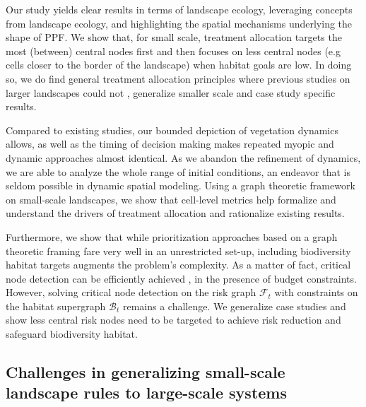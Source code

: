 Our study yields clear results in terms of landscape ecology, leveraging concepts from landscape ecology, and highlighting the spatial mechanisms underlying the shape of PPF. We show that, for small scale, treatment allocation targets the most (between) central nodes first and then focuses on less central nodes (e.g cells closer to the border of the landscape) when habitat goals are low. In doing so, we do find general treatment allocation principles where previous studies on larger landscapes could not \citep{minas_spatial_2014, rachmawati_optimisation_2016}, generalize smaller scale \citep{konoshima_spatial-endogenous_2008} and case study specific \citep{yemshanov_detecting_2021, pais_downstream_2021} results.

Compared to existing studies, our bounded depiction of vegetation dynamics allows, as well as the timing of decision making makes repeated myopic and dynamic approaches almost identical. As we abandon the refinement of dynamics, we are able to analyze the whole range of initial conditions, an endeavor that is seldom possible in dynamic spatial modeling. Using a graph theoretic framework on small-scale landscapes, we show that cell-level metrics help formalize and understand the drivers of treatment allocation and rationalize existing results. 

Furthermore, we show that while prioritization approaches based on a graph theoretic framing fare very well in an unrestricted set-up, including biodiversity habitat targets augments the problem's complexity. As a matter of fact, critical node detection can be efficiently achieved \citep{ARULSELVAN20092193}, in the presence of budget constraints. However, solving critical node detection on the risk graph $\mathcal{F}_t$ with constraints on the habitat supergraph $\mathcal{B}_t$ remains a challenge. We generalize case studies \citep{yemshanov_exploring_2022} and show less central risk nodes need to be targeted to achieve risk reduction and safeguard biodiversity habitat.

\subsection{Challenges in generalizing small-scale landscape rules to large-scale systems}

